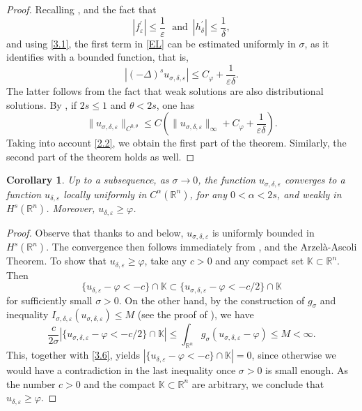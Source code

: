 \documentclass[11pt, reqno]{amsart}
\newtheorem{corollary}{Corollary}
\numberwithin{equation}{section}
\numberwithin{theorem}{section}
\numberwithin{lemma}{section}
\numberwithin{corollary}{section}
\numberwithin{remark}{section}
\numberwithin{proposition}{section}
\numberwithin{definition}{section}
\newcommand{\R}{\mathbb{R}}
\newcommand{\e}{\varepsilon}
\begin{document}
\begin{proof}
    Recalling , and the fact that 
    $$
    \left|f^\prime_\varepsilon\right|\le\frac{1}{\varepsilon}\,\,\textrm{ and }\,\left|h^\prime_\delta\right|\le\frac{1}{\delta},
    $$
	and using \eqref{3.1}, the first term in \eqref{EL} can be estimated uniformly in $\sigma$, as it identifies with a bounded function, that is, 
	\[
	\left|(-\Delta)^su_{\sigma,\delta,\varepsilon}\right|\le C_\varphi
	+\frac{1}{\varepsilon\delta}.
	\] 
    The latter follows from the fact that weak solutions are also distributional solutions.
    By , if $2s\le1$ and $\theta<2s$, one has
	\[
	\|u_{\sigma, \delta,\varepsilon}\|_{C^{0,\theta}} \le C \left( \|u_{\sigma, \delta,\varepsilon}\|_\infty + C_\varphi
	+\frac{1}{\varepsilon\delta}\right).
	\] 
	Taking into account \eqref{2.2}, we obtain the first part of the theorem. Similarly, the second part of the theorem holds as well. 
\end{proof}

\begin{corollary}\label{c3.1}
	Up to a subsequence, as $\sigma\rightarrow0$, the function $u_{\sigma,\delta,\varepsilon}$ converges to a function $u_{\delta,\varepsilon}$ locally uniformly in $C^{\alpha}(\R^{n})$, for any $0<\alpha<2s$, and weakly in $H^s(\R^n)$. Moreover, $u_{\delta,\varepsilon}\ge\varphi$.
\end{corollary}
\begin{proof}
    Observe that thanks to  and  below, $u_{\sigma,\delta,\varepsilon}$ is uniformly bounded in $H^s(\R^n)$. The convergence then follows immediately from , and the Arzel\`a-Ascoli Theorem. To show that $u_{\delta,\varepsilon}\ge\varphi$, take any $c>0$ and any compact set $\mathbb{K}\subset\R^{n}$. Then 
	\begin{equation}\label{3.6}
	\{u_{\delta,\varepsilon}-\varphi<-c\} \cap\mathbb{K}\subset\{u_{\sigma,\delta,\varepsilon}-\varphi<-c/2\}
	\cap\mathbb{K}
	\end{equation}
	for sufficiently small $\sigma>0$. 
	On the other hand, by the construction of $g_\sigma$ and inequality $I_{\sigma,\delta,\e }(u_{\sigma,\delta,\e })\le M$ (see the proof of ), we have
	$$
	\frac{c}{2\sigma}
	\left|\{u_{\sigma,\delta,\e }-\varphi<-c/2\}\cap\mathbb{K}\right|\le\int_{\R^{n}} g_\sigma(u_{\sigma,\delta,\e }-\varphi)\le M<\infty.
	$$
	This, together with \eqref{3.6}, yields $|\{u_{\delta,\e }-\varphi<-c\}\cap\mathbb{K}|=0$, since otherwise we would have a contradiction in the last inequality once $\sigma>0$ is small enough. As the number  $c>0$ and the compact $\mathbb{K}\subset\R^{n}$ are arbitrary, we conclude that $u_{\delta,\varepsilon}\ge\varphi$.
\end{proof}
\end{document}
